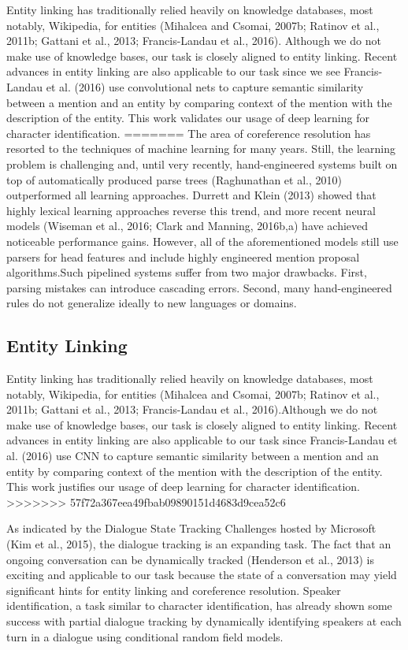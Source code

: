 \documentclass[11pt]{article}
\begin{document}
Entity linking has traditionally relied heavily on knowledge databases, most notably, Wikipedia, for entities (Mihalcea and Csomai, 2007b; Ratinov et al., 2011b; Gattani et al., 2013; Francis-Landau et al., 2016). Although we do not make use of knowledge bases, our task is closely aligned to entity linking. Recent advances in entity linking are
also applicable to our task since we see Francis-Landau et al. (2016) use convolutional nets to capture semantic similarity between a mention and an entity by comparing context of the mention with the description of the entity. This work validates our usage of deep learning for character identification.
=======
The area of coreference resolution has resorted to the techniques of machine learning for many years. Still, the learning problem is challenging and, until very recently, hand-engineered systems built on top of automatically produced parse trees (Raghunathan et al., 2010) outperformed all learning approaches. Durrett and Klein (2013) showed that highly lexical learning approaches reverse this trend, and more recent neural models (Wiseman et al., 2016; Clark and Manning, 2016b,a) have achieved noticeable performance gains. However, all of the aforementioned models still use parsers for head features and include highly engineered mention proposal algorithms.Such pipelined systems suffer from two major drawbacks. First, parsing mistakes can introduce cascading errors. Second, many hand-engineered rules do not generalize ideally to new languages or domains.  

\subsection{Entity Linking}

Entity linking has traditionally relied heavily on knowledge databases, most notably, Wikipedia, for entities (Mihalcea and Csomai, 2007b; Ratinov et al., 2011b; Gattani et al., 2013; Francis-Landau et al., 2016).Although we do not make use of knowledge bases, our task is closely aligned to entity linking. Recent advances in entity linking are also applicable to our task since Francis-Landau et al. (2016) use CNN to capture semantic similarity between a mention and an entity by comparing context of the mention with the description of the entity. This work justifies our usage of deep learning for character identification.
>>>>>>> 57f72a367eea49fbab09890151d4683d9cea52c6

As indicated by the Dialogue State Tracking Challenges hosted by Microsoft (Kim et al., 2015), the dialogue tracking is an expanding task. The fact that an ongoing conversation can be dynamically tracked (Henderson et al., 2013) is exciting and applicable to our task because the state of a conversation may yield significant hints for entity linking and coreference resolution. Speaker identification, a task similar to character identification, has already shown some success with partial dialogue tracking by dynamically identifying speakers at each turn in a dialogue using conditional random field models.
\end{document}
